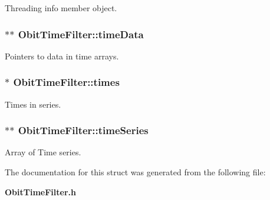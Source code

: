 Threading info member object. 

\subsubsection{$\ast$$\ast$ {\bf Obit\-Time\-Filter::time\-Data}}\label{structObitTimeFilter_o6}


Pointers to data in time arrays. 

\subsubsection{$\ast$ {\bf Obit\-Time\-Filter::times}}\label{structObitTimeFilter_o7}


Times in series. 

\subsubsection{$\ast$$\ast$ {\bf Obit\-Time\-Filter::time\-Series}}\label{structObitTimeFilter_o5}


Array of Time series. 



The documentation for this struct was generated from the following file:\begin{CompactItemize}
\item 
{\bf Obit\-Time\-Filter.h}\end{CompactItemize}

